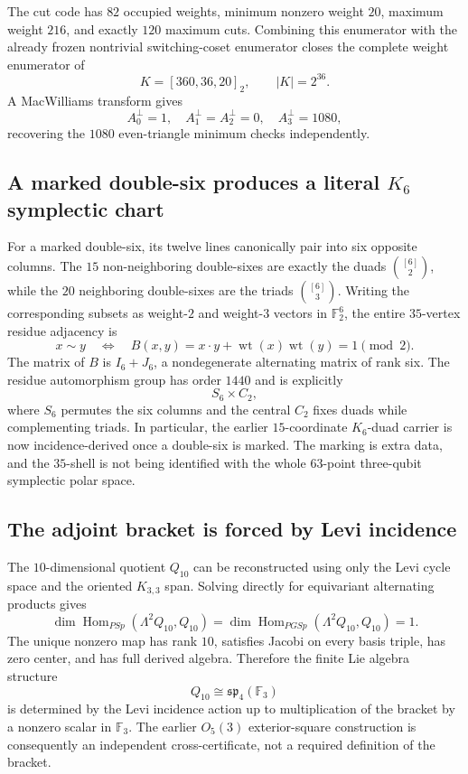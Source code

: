 The cut code has $82$ occupied weights, minimum nonzero weight $20$, maximum
weight $216$, and exactly $120$ maximum cuts.  Combining this enumerator with
the already frozen nontrivial switching-coset enumerator closes the complete
weight enumerator of
\[
  K=[360,36,20]_2,
  \qquad |K|=2^{36}.
\]
A MacWilliams transform gives
\[
  A_0^\perp=1,\quad A_1^\perp=A_2^\perp=0,\quad
  A_3^\perp=1080,
\]
recovering the $1080$ even-triangle minimum checks independently.

\subsection{A marked double-six produces a literal $K_6$ symplectic chart}

For a marked double-six, its twelve lines canonically pair into six opposite
columns.  The $15$ non-neighboring double-sixes are exactly the duads
$\binom{[6]}2$, while the $20$ neighboring double-sixes are the triads
$\binom{[6]}3$.  Writing the corresponding subsets as weight-$2$ and
weight-$3$ vectors in $\mathbb F_2^6$, the entire $35$-vertex residue adjacency
is
\[
  x\sim y
  \quad\Longleftrightarrow\quad
  B(x,y)=x\cdot y+\operatorname{wt}(x)\operatorname{wt}(y)=1\pmod2.
\]
The matrix of $B$ is $I_6+J_6$, a nondegenerate alternating matrix of rank
six.  The residue automorphism group has order $1440$ and is explicitly
\[
  S_6\times C_2,
\]
where $S_6$ permutes the six columns and the central $C_2$ fixes duads while
complementing triads.  In particular, the earlier $15$-coordinate $K_6$-duad
carrier is now incidence-derived once a double-six is marked.  The marking is
extra data, and the $35$-shell is not being identified with the whole
$63$-point three-qubit symplectic polar space.

\subsection{The adjoint bracket is forced by Levi incidence}

The $10$-dimensional quotient $Q_{10}$ can be reconstructed using only the
Levi cycle space and the oriented $K_{3,3}$ span.  Solving directly for
equivariant alternating products gives
\[
  \dim\operatorname{Hom}_{PSp}(\Lambda^2Q_{10},Q_{10})
  =\dim\operatorname{Hom}_{PGSp}(\Lambda^2Q_{10},Q_{10})=1.
\]
The unique nonzero map has rank $10$, satisfies Jacobi on every basis triple,
has zero center, and has full derived algebra.  Therefore the finite Lie
algebra structure
\[
  Q_{10}\cong\mathfrak{sp}_4(\mathbb F_3)
\]
is determined by the Levi incidence action up to multiplication of the bracket
by a nonzero scalar in $\mathbb F_3$.  The earlier $O_5(3)$ exterior-square
construction is consequently an independent cross-certificate, not a required
definition of the bracket.

